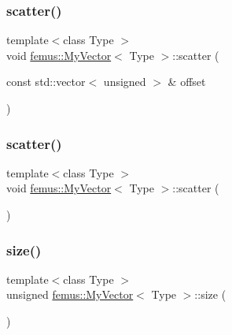 \mbox{\label{classfemus_1_1_my_vector_a16baa1a2685edbd7f053f36271d4c58c}} 
\subsubsection{\texorpdfstring{scatter()}{scatter()}\hspace{0.1cm}{\footnotesize\ttfamily [1/2]}}
{\footnotesize\ttfamily template$<$class Type $>$ \\
void \mbox{\hyperlink{classfemus_1_1_my_vector}{femus\+::\+My\+Vector}}$<$ Type $>$\+::scatter (\begin{DoxyParamCaption}\item[{const std\+::vector$<$ unsigned $>$ \&}]{offset }\end{DoxyParamCaption})}

\mbox{\label{classfemus_1_1_my_vector_a5d074ea564b1c3b960d419243b0ad1cd}} 
\subsubsection{\texorpdfstring{scatter()}{scatter()}\hspace{0.1cm}{\footnotesize\ttfamily [2/2]}}
{\footnotesize\ttfamily template$<$class Type $>$ \\
void \mbox{\hyperlink{classfemus_1_1_my_vector}{femus\+::\+My\+Vector}}$<$ Type $>$\+::scatter (\begin{DoxyParamCaption}{ }\end{DoxyParamCaption})}

\mbox{\label{classfemus_1_1_my_vector_aee4dc1225adaac2f96cacbf36d84a06a}} 
\subsubsection{\texorpdfstring{size()}{size()}}
{\footnotesize\ttfamily template$<$class Type $>$ \\
unsigned \mbox{\hyperlink{classfemus_1_1_my_vector}{femus\+::\+My\+Vector}}$<$ Type $>$\+::size (\begin{DoxyParamCaption}{ }\end{DoxyParamCaption})}

